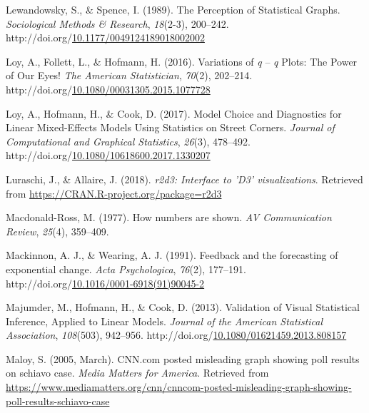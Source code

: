 \documentclass[print]{nuthesis}
\newlength{\cslhangindent}
\newenvironment{CSLReferences}[2]%
{\setlength{\parindent}{0pt}%
\everypar{\setlength{\hangindent}{\cslhangindent}}\ignorespaces}%
{\par}
\begin{document}
\begin{CSLReferences}{1}{0}
\leavevmode{}%
Lewandowsky, S., \& Spence, I. (1989). The {Perception} of {Statistical} {Graphs}. \emph{Sociological Methods \& Research}, \emph{18}(2-3), 200--242. http://doi.org/\href{https://doi.org/10.1177/0049124189018002002}{10.1177/0049124189018002002}

\leavevmode{}%
Loy, A., Follett, L., \& Hofmann, H. (2016). Variations of \emph{q} -- \emph{q} {Plots}: {The} {Power} of {Our} {Eyes}! \emph{The American Statistician}, \emph{70}(2), 202--214. http://doi.org/\href{https://doi.org/10.1080/00031305.2015.1077728}{10.1080/00031305.2015.1077728}

\leavevmode{}%
Loy, A., Hofmann, H., \& Cook, D. (2017). Model {Choice} and {Diagnostics} for {Linear} {Mixed}-{Effects} {Models} {Using} {Statistics} on {Street} {Corners}. \emph{Journal of Computational and Graphical Statistics}, \emph{26}(3), 478--492. http://doi.org/\href{https://doi.org/10.1080/10618600.2017.1330207}{10.1080/10618600.2017.1330207}

\leavevmode{}%
Luraschi, J., \& Allaire, J. (2018). \emph{r2d3: Interface to 'D3' visualizations}. Retrieved from \url{https://CRAN.R-project.org/package=r2d3}

\leavevmode{}%
Macdonald-Ross, M. (1977). How numbers are shown. \emph{AV Communication Review}, \emph{25}(4), 359--409.

\leavevmode{}%
Mackinnon, A. J., \& Wearing, A. J. (1991). Feedback and the forecasting of exponential change. \emph{Acta Psychologica}, \emph{76}(2), 177--191. http://doi.org/\href{https://doi.org/10.1016/0001-6918(91)90045-2}{10.1016/0001-6918(91)90045-2}

\leavevmode{}%
Majumder, M., Hofmann, H., \& Cook, D. (2013). Validation of {Visual} {Statistical} {Inference}, {Applied} to {Linear} {Models}. \emph{Journal of the American Statistical Association}, \emph{108}(503), 942--956. http://doi.org/\href{https://doi.org/10.1080/01621459.2013.808157}{10.1080/01621459.2013.808157}

\leavevmode{}%
Maloy, S. (2005, March). CNN.com posted misleading graph showing poll results on schiavo case. \emph{Media Matters for America}. Retrieved from \url{https://www.mediamatters.org/cnn/cnncom-posted-misleading-graph-showing-poll-results-schiavo-case}


\end{CSLReferences}
\end{document}
